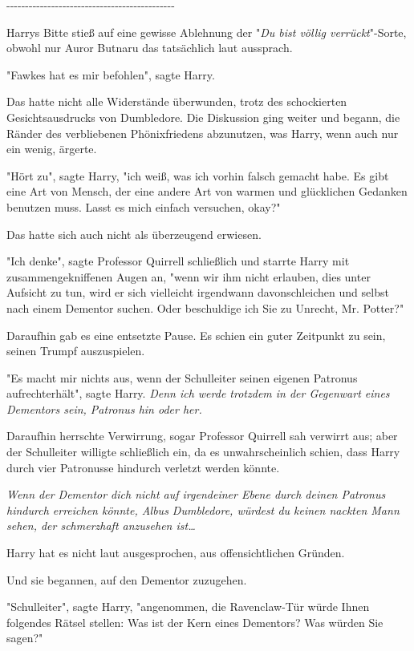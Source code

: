 {-\/-\/-\/-\/-\/-\/-\/-\/-\/-\/-\/-\/-\/-\/-\/-\/-\/-\/-\/-\/-\/-\/-\/-\/-\/-\/-\/-\/-\/-\/-\/-\/-\/-\/-\/-\/-\/-\/-\/-\/-\/-\/-\/-\/-

Harrys Bitte stieß auf eine gewisse Ablehnung der "\emph{Du bist völlig verrückt}"-Sorte, obwohl nur Auror Butnaru das tatsächlich laut aussprach.

"Fawkes hat es mir befohlen", sagte Harry.

Das hatte nicht alle Widerstände überwunden, trotz des schockierten Gesichtsausdrucks von Dumbledore. Die Diskussion ging weiter und begann, die Ränder des verbliebenen Phönixfriedens abzunutzen, was Harry, wenn auch nur ein wenig, ärgerte.

"Hört zu", sagte Harry, "ich weiß, was ich vorhin falsch gemacht habe. Es gibt eine Art von Mensch, der eine andere Art von warmen und glücklichen Gedanken benutzen muss. Lasst es mich einfach versuchen, okay?"

Das hatte sich auch nicht als überzeugend erwiesen.

"Ich denke", sagte Professor Quirrell schließlich und starrte Harry mit zusammengekniffenen Augen an, "wenn wir ihm nicht erlauben, dies unter Aufsicht zu tun, wird er sich vielleicht irgendwann davonschleichen und selbst nach einem Dementor suchen. Oder beschuldige ich Sie zu Unrecht, Mr. Potter?"

Daraufhin gab es eine entsetzte Pause. Es schien ein guter Zeitpunkt zu sein, seinen Trumpf auszuspielen.

"Es macht mir nichts aus, wenn der Schulleiter seinen eigenen Patronus aufrechterhält", sagte Harry. \emph{Denn ich werde trotzdem in der Gegenwart eines Dementors sein, Patronus hin oder her.}

Daraufhin herrschte Verwirrung, sogar Professor Quirrell sah verwirrt aus; aber der Schulleiter willigte schließlich ein, da es unwahrscheinlich schien, dass Harry durch vier Patronusse hindurch verletzt werden könnte.

\emph{Wenn der Dementor dich nicht auf irgendeiner Ebene durch deinen Patronus hindurch erreichen könnte, Albus Dumbledore, würdest du keinen nackten Mann sehen, der schmerzhaft anzusehen ist…}

Harry hat es nicht laut ausgesprochen, aus offensichtlichen Gründen.

Und sie begannen, auf den Dementor zuzugehen.

"Schulleiter", sagte Harry, "angenommen, die Ravenclaw-Tür würde Ihnen folgendes Rätsel stellen: Was ist der Kern eines Dementors? Was würden Sie sagen?"

}
